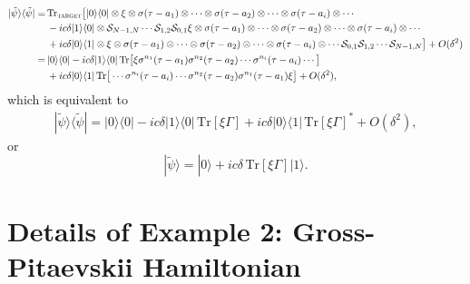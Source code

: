 \documentclass[aps,pra,twocolumn,floatfix,groupedaddress,superscriptaddress,nofootinbib,notitlepage]{revtex4-2}
\begin{document}
\begin{align}
|\tilde{\psi}\rangle\langle \tilde{\psi}|=& \, \mathrm{Tr}_{\textsc{target}}\big[|0\rangle\langle 0| \otimes \xi \otimes \sigma(\tau-a_{1})\otimes\cdots \otimes \sigma(\tau-a_{2})\otimes \cdots \otimes  \sigma(\tau-a_{i})\otimes\cdots \nonumber\\
&\, -ic\delta |1\rangle\langle 0|\otimes \mathcal{S}_{N-1,N}\cdots \mathcal{S}_{1,2} \mathcal{S}_{0,1} \xi \otimes \sigma(\tau-a_{1}) \otimes \cdots \otimes \sigma(\tau-a_{2})\otimes\cdots \otimes \sigma(\tau-a_{i})\otimes\cdots \nonumber\\
&\, +ic\delta |0\rangle\langle 1|\otimes \xi \otimes \sigma(\tau-a_{1})\otimes\cdots \otimes \sigma(\tau-a_{2})\otimes\cdots \otimes \sigma(\tau-a_{i}) \otimes \cdots \mathcal{S}_{0,1} \mathcal{S}_{1,2}\cdots \mathcal{S}_{N-1,N} 
\big] + O(\delta^{2}) \nonumber\\
= &\, |0\rangle\langle 0| -ic\delta |1\rangle\langle 0| \, \mathrm{Tr}\big[\xi \sigma^{n_{1}}(\tau-a_{1})\sigma^{n_{2}}(\tau-a_{2})\cdots \sigma^{n_{i}}(\tau-a_{i})\cdots\big] \nonumber\\
&\, +ic\delta |0\rangle\langle 1| \, \mathrm{Tr}\big[\cdots \sigma^{n_{i}}(\tau-a_{i})\cdots \sigma^{n_{2}}(\tau-a_{2})\sigma^{n_{1}}(\tau-a_{1}) \xi\big] +O(\delta^{2}),
\end{align}
which is equivalent to 
\begin{align}
|\tilde{\psi}\rangle\langle \tilde{\psi}|=|0\rangle\langle 0| -ic \delta |1\rangle\langle 0| \, \mathrm{Tr}[\xi \Gamma]+ic\delta |0\rangle\langle 1| \, \mathrm{Tr}[\xi \Gamma]^{*} + O(\delta^{2}),
\end{align}
or
\begin{equation}
|\tilde{\psi}\rangle = |0\rangle + ic\delta\,\mathrm{Tr}[\xi \Gamma]|1\rangle. 
\end{equation}

\section{Details of Example 2: Gross-Pitaevskii Hamiltonian}
\label{app:GP}
\end{document}
